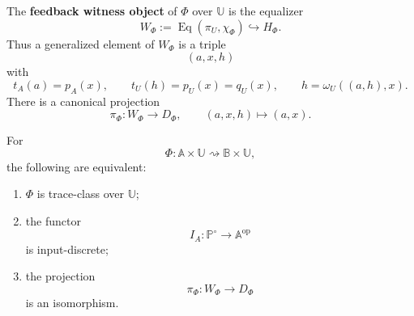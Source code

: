 \begin{definition}
\label{def:feedback-witness-object}
The \textbf{feedback witness object} of \(\Phi\) over \(\mathbb U\) is the
equalizer
\[
W_\Phi
:=
\operatorname{Eq}(\pi_U,\chi_\Phi)
\hookrightarrow
H_\Phi.
\]
Thus a generalized element of \(W_\Phi\) is a triple
\[
(a,x,h)
\]
with
\[
t_A(a)=p_A(x),
\qquad
t_U(h)=p_U(x)=q_U(x),
\qquad
h=\omega_U((a,h),x).
\]
There is a canonical projection
\[
\pi_\Phi:W_\Phi\to D_\Phi,
\qquad
(a,x,h)\longmapsto(a,x).
\]
\end{definition}

\begin{theorem}
\label{thm:internal-trace-class-criterion}
For
\[
\Phi:
\mathbb A\times\mathbb U
\rightsquigarrow
\mathbb B\times\mathbb U,
\]
the following are equivalent:
\begin{enumerate}
\item \(\Phi\) is trace-class over \(\mathbb U\);
\item the functor
\[
I_A:\mathbb P^\circ\to\mathbb A^{\mathrm{op}}
\]
is input-discrete;
\item the projection
\[
\pi_\Phi:W_\Phi\to D_\Phi
\]
is an isomorphism.
\end{enumerate}
\end{theorem}

